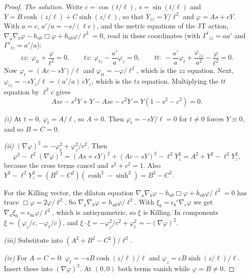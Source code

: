 \begin{proof}
\emph{The solution.} Write $c=\cos(t/\ell)$, $s=\sin(t/\ell)$ and $Y=B\cosh(z/\ell)+C\sinh(z/\ell)$, so that $Y_{zz}=Y/\ell^2$ and $\varphi=As+cY$. With $a=c$, $a'/a=-s/(\ell c)$, and the metric equations of the JT action, $\nabla_a\nabla_b\varphi-h_{ab}\Box\varphi+h_{ab}\varphi/\ell^2=0$, read in these coordinates (with $\Gamma^t{}_{zz}=aa'$ and $\Gamma^z{}_{tz}=a'/a$):
\[
zz:\ \varphi_{tt}+\frac\varphi{\ell^2}=0,\qquad tz:\ \varphi_{tz}-\frac{a'}a\varphi_z=0,\qquad tt:\ -\frac{a'}a\varphi_t+\frac{\varphi_{zz}}{a^2}-\frac\varphi{\ell^2}=0 .
\]
Now $\varphi_t=(Ac-sY)/\ell$ and $\varphi_{tt}=-\varphi/\ell^2$, which is the $zz$ equation. Next, $\varphi_{tz}=-sY_z/\ell=(a'/a)\,cY_z$, which is the $tz$ equation. Multiplying the $tt$ equation by $\ell^2c$ gives
\[
Asc-s^2Y+Y-Asc-c^2Y=Y(1-s^2-c^2)=0 .
\]

\emph{(i)} At $t=0$, $\varphi_t=A/\ell$, so $A=0$. Then $\varphi_t=-sY/\ell=0$ for $t\ne0$ forces $Y\equiv0$, and so $B=C=0$.

\emph{(ii)} $(\nabla\varphi)^2=-\varphi_t^2+\varphi_z^2/c^2$. Then
\[
\varphi^2-\ell^2(\nabla\varphi)^2=(As+cY)^2+(Ac-sY)^2-\ell^2Y_z^2=A^2+Y^2-\ell^2Y_z^2 ,
\]
because the cross terms cancel and $s^2+c^2=1$. Also $Y^2-\ell^2Y_z^2=(B^2-C^2)(\cosh^2-\sinh^2)=B^2-C^2$.

For the Killing vector, the dilaton equation $\nabla_a\nabla_b\varphi-h_{ab}\Box\varphi+h_{ab}\varphi/\ell^2=0$ has trace $\Box\varphi=2\varphi/\ell^2$. So $\nabla_a\nabla_b\varphi=h_{ab}\varphi/\ell^2$. With $\xi_b=\epsilon_b{}^c\nabla_c\varphi$ we get $\nabla_a\xi_b=\epsilon_{ba}\varphi/\ell^2$, which is antisymmetric, so $\xi$ is Killing. In components $\xi=(\varphi_z/c,-\varphi_t/c)$, and $\xi\cdot\xi=-\varphi_z^2/c^2+\varphi_t^2=-(\nabla\varphi)^2$.

\emph{(iii)} Substitute into $(A^2+B^2-C^2)/\ell^2$.

\emph{(iv)} For $A=C=0$: $\varphi_t=-sB\cosh(z/\ell)/\ell$ and $\varphi_z=cB\sinh(z/\ell)/\ell$. Insert these into $(\nabla\varphi)^2$. At $(0,0)$ both terms vanish while $\varphi=B\ne0$.
\end{proof}


